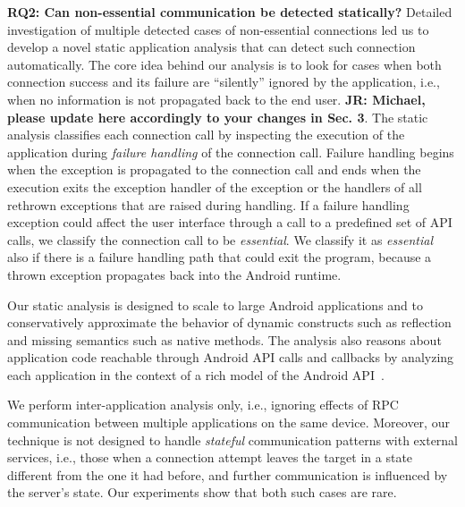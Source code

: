\noindent 
{\bf RQ2: Can non-essential communication be detected statically?}
Detailed investigation of multiple detected cases of non-essential connections led us to develop a novel static application
analysis that can detect such connection automatically. 
The core idea behind our analysis is to look for cases when both connection success and its failure 
are ``silently''
ignored by the application, i.e., when no information is not propagated back to the end user.
{\bf JR: Michael, please update here accordingly to your changes in Sec. 3}.
  The static analysis
classifies each connection call by inspecting the execution of the
application during {\it failure handling} of the connection call.
Failure handling begins when the exception is propagated to the
connection call and ends when the execution exits the exception
handler of the exception or the handlers of all rethrown exceptions
that are raised during handling.
If a failure handling exception could affect the user interface
through a call to a predefined set of API calls, we classify the
connection call to be {\em essential}.  We classify it as {\em essential}
also if there is a failure handling
path that could exit the program, because a thrown exception
propagates back into the Android runtime.

Our static analysis is designed to scale to large Android applications
and to conservatively approximate the behavior of dynamic constructs
such as reflection and missing semantics such as native methods.  The
analysis also reasons about application code reachable through Android
API calls and callbacks by analyzing each application in the context
of a rich model of the Android
API~\cite{Gordon:Kim:Perkins:Gilham:Nguyen:Rinard:NDSS15}. 

We perform inter-application analysis only, i.e., ignoring effects of RPC communication between multiple applications on the same device. Moreover, our technique is not designed to handle
\emph{stateful} communication patterns with external services, i.e., those when a connection attempt leaves the target in a state different from the one it had before, and further communication is influenced by the server's state. Our experiments show that both such cases are rare. 


